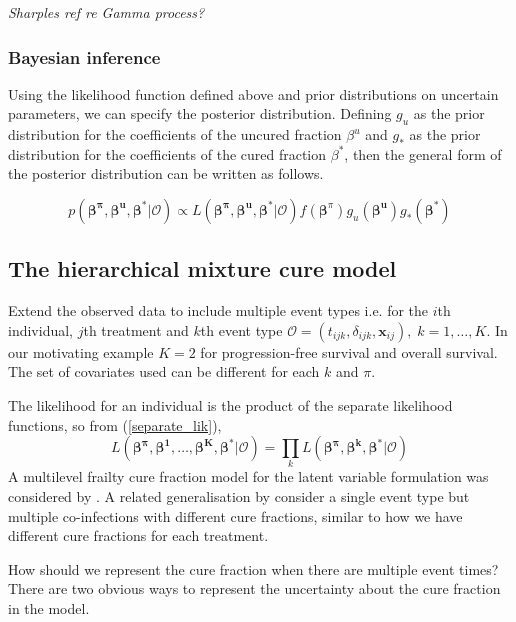 \documentclass[AMA,STIX1COL]{WileyNJD-v2}
\begin{document}
{\it Sharples ref re Gamma process?}

\subsubsection{Bayesian inference}
Using the likelihood function defined above and prior distributions on
uncertain parameters, we can specify the posterior distribution.
Defining $g_u$ as the prior distribution for the coefficients of the
uncured fraction $\beta^u$ and $g_*$ as the prior distribution for the
coefficients of the cured fraction $\beta^*$, then the general form of
the posterior distribution can be written as follows.

\begin{equation}
\label{eqn:basic_posterior}
p(\boldsymbol{\beta^{\pi}}, \boldsymbol{\beta^u}, \boldsymbol{\beta^*} | \mathcal{O}) \propto
L(\boldsymbol{\beta^{\pi}}, \boldsymbol{\beta^{u}}, \boldsymbol{\beta^*} | \mathcal{O}) f(\boldsymbol{\beta}^{\pi}) g_{u}(\boldsymbol{\beta^{u}})g_*(\boldsymbol{\beta^*})
\end{equation}


\subsection{The hierarchical mixture cure model}
Extend the observed data to include multiple event types
i.e. for the $i$th individual, $j$th treatment and $k$th event type 
$\mathcal{O} = (t_{ijk}, \delta_{ijk}, \boldsymbol{x}_{ij}), \; k = 1, \ldots, K$.
In our motivating example $K = 2$ for progression-free survival and overall survival.
The set of covariates used can be different for each $k$ and $\pi$.

The likelihood for an individual is the product of the separate likelihood functions, so from (\ref{separate_lik}),
$$
L(\boldsymbol{\beta^{\pi}}, \boldsymbol{\beta^1}, \ldots, \boldsymbol{\beta^K}, \boldsymbol{\beta^*} | \mathcal{O}) =
\prod_k L(\boldsymbol{\beta^{\pi}}, \boldsymbol{\beta^{k}}, \boldsymbol{\beta^*} | \mathcal{O})
$$
A multilevel frailty cure fraction model for the latent variable formulation was considered by \cite{Tawiah2020}.
A related generalisation by \cite{Balogun2020} consider a single event type but multiple co-infections with different cure fractions,
similar to how we have different cure fractions for each treatment.

How should we represent the cure fraction when there are multiple event times?
There are two obvious ways to represent the uncertainty about the cure fraction in the model.
\end{document}
